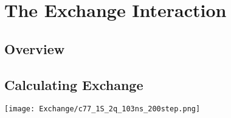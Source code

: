 \documentclass[../Thesis.tex]{subfiles}
\begin{document}
\chapter{The Exchange Interaction}

\section{Overview}

\section{Calculating Exchange}


\texttt{[image: Exchange/c77\_1S\_2q\_103ns\_200step.png]}
\end{document}
